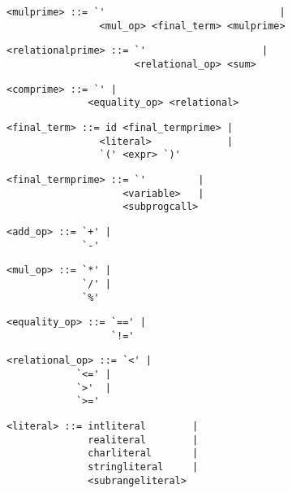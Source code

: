 \begin{footnotesize}
\begin{lstlisting}[frame=single, label={mulprime}, language=pie]
<mulprime> ::= `'                              | 
                <mul_op> <final_term> <mulprime>
\end{lstlisting}

\begin{lstlisting}[frame=single, label={relationalprime}, language=pie]
<relationalprime> ::= `'                    | 
                      <relational_op> <sum>
\end{lstlisting}

\begin{lstlisting}[frame=single, label={comprime}, language=pie]
<comprime> ::= `' |
              <equality_op> <relational>
\end{lstlisting}

\begin{lstlisting}[frame=single, label={final_term}, language=pie]
<final_term> ::= id <final_termprime> | 
                <literal>             | 
                `(' <expr> `)'
\end{lstlisting}

\begin{lstlisting}[frame=single, label={final_termprime}, language=pie]
<final_termprime> ::= `'         | 
                    <variable>   | 
                    <subprogcall>  
\end{lstlisting}

\begin{lstlisting}[frame=single, label={add_op}, language=pie]
<add_op> ::= `+' | 
             `-'
\end{lstlisting}

\begin{lstlisting}[frame=single, label={mul_op}, language=pie]
<mul_op> ::= `*' | 
             `/' |
             `%'
\end{lstlisting}

\begin{lstlisting}[frame=single, label={equality_op}, language=pie]
<equality_op> ::= `==' | 
                  `!='
\end{lstlisting}

\begin{lstlisting}[frame=single, label={relational_op}, language=pie]
<relational_op> ::= `<' | 
	   	    `<=' |
		    `>'  |
		    `>='
\end{lstlisting}

\begin{lstlisting}[frame=single, label={literal}, language=pie]
<literal> ::= intliteral        | 
              realiteral        | 
              charliteral       |
              stringliteral     |
              <subrangeliteral>
\end{lstlisting}


\end{footnotesize}
